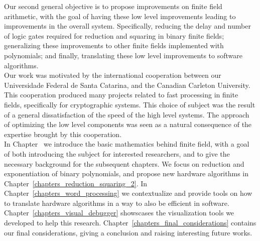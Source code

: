 Our second general objective is to propose improvements on finite field arithmetic, with the goal of having these low level improvements leading to improvements in the overall system. Specifically, reducing the delay and number of logic gates required for reduction and squaring in binary finite fields; generalizing these improvements to other finite fields implemented with polynomials; and finally, translating these low level improvements to software algorithms. \\

Our work was motivated by the international cooperation between our Universidade Federal de Santa Catarina, and the Canadian Carleton University. This cooperation produced many projects related to fast processing in finite fields, specifically for cryptographic systems. This choice of subject was the result of a general dissatisfaction of the speed of the high level systems. The approach of optimizing the low level components was seen as a natural consequence of the expertise brought by this cooperation. \\

In Chapter~\label{cap:background} we introduce the basic mathematics behind finite field, with a goal of both introducing the subject for interested researchers, and to give the necessary background for the subsequent chapters. We focus on reduction and exponentiation of binary polynomials, and propose new hardware algorithms in Chapter~\ref{chapters_reduction_squaring_2}. In Chapter~\ref{chapters_word_processing} we contextualize and provide tools on how to translate hardware algorithms in a way to also be efficient in software. Chapter~\ref{chapters_visual_debugger} showscases the visualization tools we developed to help this research. Chapter~\ref{chapters_final_considerations} contains our final considerations, giving a conclusion and raising interesting future works. \\


%
%
%
%
